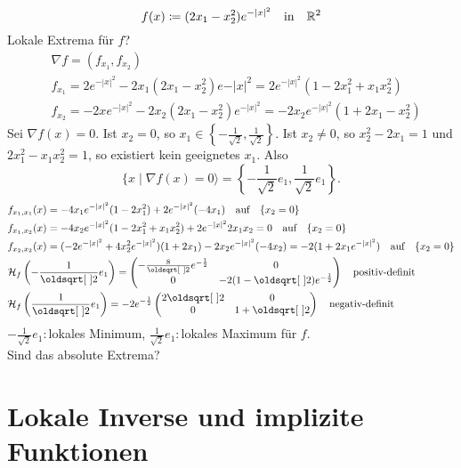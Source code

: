 \begin{beispiel*}
	\[ f(x)\coloneqq (2x_1-x_2^2)e^{-|x|^2}\quad\text{in}\quad\mathbb{R}^2 \]
	Lokale Extrema f\"ur $ f $?
	\begin{align*}
	&\nabla f=(f_{x_1},f_{x_2})\\
	&f_{x_1}=2e^{-|x|^2}-2x_1(2x_1-x_2^2)e{-|x|^2}=2e^{-|x|^2}(1-2x_1^2+x_1x_2^2)\\
	&f_{x_2}=-2xe^{-|x|^2}-2x_2(2x_1-x_2^2)e^{-|x|^2}=-2x_2e^{-|x|^2}(1+2x_1-x_2^2)
	\end{align*}
	Sei $ \nabla f(x)=0 $. Ist $ x_2=0 $, so $ x_1\in\left\lbrace-\frac{1}{\sqrt{2}},\frac{1}{\sqrt 2}\right\rbrace $. Ist $ x_2\neq 0 $, so $ x_2^2-2x_1=1 $ und $ 2x_1^2-x_1x_2^2=1 $, so existiert kein geeignetes $ x_1 $. Also
	\[ \lbrace x\mid\nabla f(x)=0\rangle=\left\lbrace-\frac{1}{\sqrt{2}}e_1,\frac{1}{\sqrt 2}e_1\right\rbrace. \]
	\begin{align*}
      & f_{x_1,x_1}(x)=-4x_1e^{-|x|^2}(1-2x_1^2)+2e^{-|x|^2}(-4x_1)\quad\text{auf}\quad\lbrace x_2=0\rbrace\\
      &f_{x_1,x_2}(x)=-4x_2e^{-|x|^2}(1-2x_1^2+x_1x_2^2)+2e^{-|x|^2}2x_1x_2=0\quad\text{auf}\quad\lbrace x_2=0\rbrace\\
      &f_{x_2,x_2}(x)=(-2e^{-|x|^2}+4x_2^2e^{-|x|^2})(1+2x_1)-2x_2e^{-|x|^2}(-4x_2)=-2(1+2x_1e^{-|x|^2})\quad\text{auf}\quad\lbrace x_2=0\rbrace\\
      &\sH_f\left(-\frac{1}{\sqrt 2}e_1\right)=\begin{pmatrix}
      -\frac{8}{\sqrt 2}e^{-\frac{1}{2}}&0\\0&-2(1-\sqrt 2)e^{-\frac{1}{2}}
      \end{pmatrix}\quad\text{positiv-definit}\\&\sH_f\left(\frac{1}{\sqrt 2}e_1\right)=-2e^{-\frac{1}{2}}\begin{pmatrix}
      2\sqrt 2&0\\0&1+\sqrt 2
      \end{pmatrix}\quad\text{negativ-definit}
	\end{align*}
	$ -\frac{1}{\sqrt 2}e_1: $lokales Minimum, $ \frac{1}{\sqrt 2}e_1: $lokales Maximum f\"ur $ f $.\\
	Sind das absolute Extrema?
\end{beispiel*}
\section{Lokale Inverse und implizite Funktionen}
